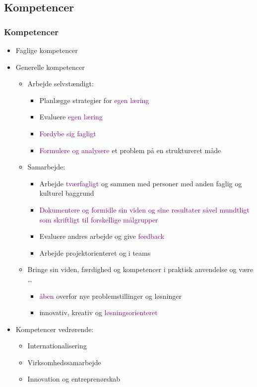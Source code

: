 {\subsection{Kompetencer}
\begin{frame}[fragile]
  \frametitle{Kompetencer}
  \vspace{-3mm}
  \begin{itemize}
    \pause
    \item Faglige kompetencer
    \pause
    \item Generelle kompetencer
      \begin{itemize}
        \pause
        \item Arbejde selvstændigt:
          \begin{itemize}
            \item Planlægge strategier for \textcolor{purple}{egen læring}
            \item Evaluere \textcolor{purple}{egen læring}
            \item \textcolor{purple}{Fordybe sig fagligt}
            \item \textcolor{purple}{Formulere og analysere} et problem på en struktureret måde
          \end{itemize}
        \pause
        \item Samarbejde:
          \begin{itemize}
            \item Arbejde \textcolor{purple}{tværfagligt} og sammen med personer med anden faglig og kulturel
baggrund
            \item \textcolor{purple}{Dokumentere og formidle sin viden og sine resultater såvel
mundtligt som skriftligt til forskellige målgrupper}
            \item Evaluere andres arbejde og give \textcolor{purple}{feedback}
            \item Arbejde projektorienteret og i teams
          \end{itemize}
        \pause
        \item Bringe sin viden, færdighed og kompetencer i praktisk anvendelse og være \ldots
          \begin{itemize}
            \item \textcolor{purple}{åben} overfor nye problemstillinger og løsninger
            \item innovativ, kreativ og \textcolor{purple}{løsningsorienteret}
          \end{itemize}
      \end{itemize}
    \pause
    \item Kompetencer vedrørende:
      \begin{itemize}
        \item Internationalisering
        \item Virksomhedssamarbejde
        \item Innovation og entreprenørskab
      \end{itemize}
  \end{itemize}
\end{frame}

}
